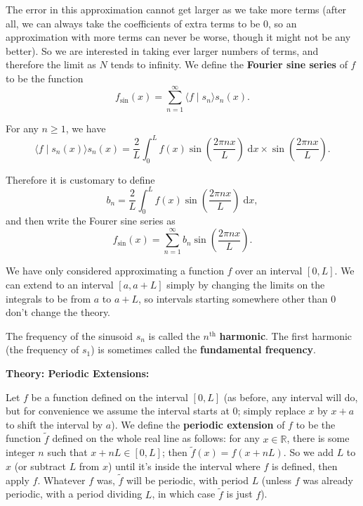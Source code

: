 \documentclass{article}
\newcommand{\diff}{\;\mathrm{d}}
\begin{document}
The error in this approximation cannot get larger as we take more terms (after all, we can always take the coefficients of extra terms to be 0, so an approximation with more terms can never be worse, though it might not be any better). So we are interested in taking ever larger numbers of terms, and therefore the limit as $N$ tends to infinity. We define the \textbf{Fourier sine series} of $f$ to be the function
\[f_\mathrm{sin} (x) = \sum_{n=1}^\infty \langle f\mid s_n\rangle s_n(x).\]

For any $n\geq 1$, we have
\[\langle f\mid s_n(x)\rangle s_n(x) = \frac{2}{L}\int_0^L f(x)\sin\left(\frac{2\pi nx}{L}\right)\diff x \times \sin\left(\frac{2\pi nx}{L}\right).\]

Therefore it is customary to define
\[b_n=\frac{2}{L}\int_0^L f(x)\sin\left(\frac{2\pi nx}{L}\right)\diff x,\]
and then write the Fourer sine series as
\[f_\mathrm{sin}(x)=\sum_{n=1}^\infty b_n\sin\left(\frac{2\pi nx}{L}\right).\]

We have only considered approximating a function $f$ over an interval $[0,L]$. We can extend to an interval $[a,a+L]$ simply by changing the limits on the integrals to be from $a$ to $a+L$, so intervals starting somewhere other than 0 don't change the theory.

The frequency of the sinusoid $s_n$ is called the $n^\mathrm{th}$ \textbf{harmonic}. The first harmonic (the frequency of $s_1$) is sometimes called the \textbf{fundamental frequency}.

\clearpage












\textbf{Theory: Periodic Extensions:}\bigskip


Let $f$ be a function defined on the interval $[0,L]$ (as before, any interval will do, but for convenience we assume the interval starts at 0; simply replace $x$ by $x+a$ to shift the interval by $a$). We define the \textbf{periodic extension} of $f$ to be the function $\tilde{f}$ defined on the whole real line as follows: for any $x\in\mathbb{R}$, there is some integer $n$ such that $x+nL\in[0,L]$; then $\tilde{f}(x)=f(x+nL)$. So we add $L$ to $x$ (or subtract $L$ from $x$) until it's inside the interval where $f$ is defined, then apply $f$. Whatever $f$ was, $\tilde{f}$ will be periodic, with period $L$ (unless $f$ was already periodic, with a period dividing $L$, in which case $\tilde{f}$ is just $f$).\medskip
\end{document}
